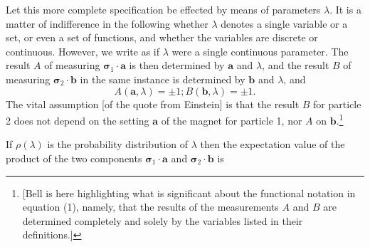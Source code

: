 Let this more complete specification be effected by means of parameters $\lambda$. It is a matter of indifference
in the following whether $\lambda$ denotes a single variable or a set, or even a set of functions, and whether
the variables are discrete or continuous. However, we write as if $\lambda$ were a single continuous parameter.
The result $A$ of measuring $\pmb{\sigma}_1 \cdot \pmb{a}$ is then determined by $\pmb{a}$ and $\lambda$, and the result $B$ of measuring 
$\pmb{\sigma}_2 \cdot \pmb{b}$ in the same instance is determined by $\pmb{b}$ and $\lambda$, and
%
\begin{equation}
A(\pmb{a}, \lambda) = \pm1; B(\pmb{b}, \lambda) = \pm 1.
\end{equation}
%
The vital assumption [of the quote from Einstein] is that the result $B$ for particle 2 does not depend on the setting $\pmb{a}$ of the magnet
for particle 1, nor $A$ on $\pmb{b}$.\footnote{[Bell is here highlighting what is significant about the functional notation in equation (1), namely, that the results of the measurements $A$ and $B$ are determined completely and solely by the variables listed in their definitions.]} 

If $\rho(\lambda)$ is the probability distribution of $\lambda$ then the expectation value of the product of the two 
components $\pmb{\sigma}_1 \cdot \pmb{a}$ and $\pmb{\sigma}_2 \cdot \pmb{b}$ is

